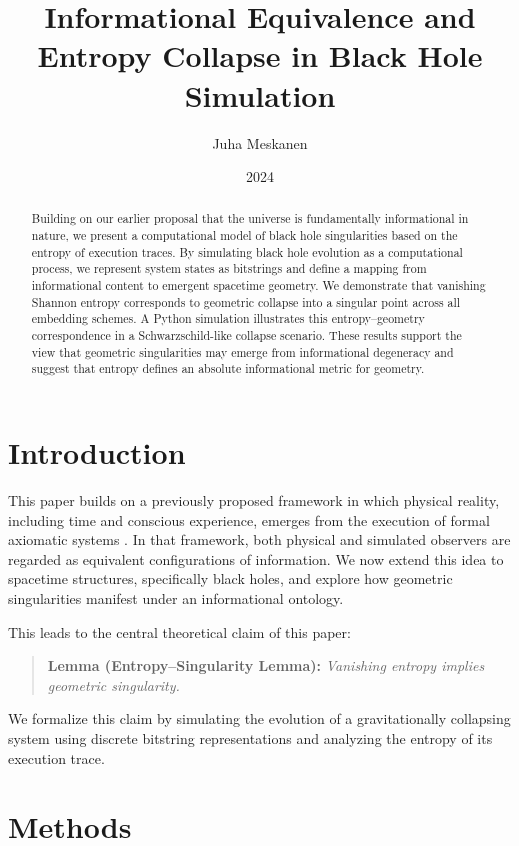 \documentclass[11pt]{article}
\title{Informational Equivalence and Entropy Collapse in Black Hole Simulation}
\author{Juha Meskanen}
\date{2024}
\begin{document}
\maketitle

\begin{abstract}
  Building on our earlier proposal that the universe is fundamentally informational in nature, we present a computational model of black hole singularities based on the entropy of execution traces. By simulating black hole evolution as a computational process, we represent system states as bitstrings and define a mapping from informational content to emergent spacetime geometry. We demonstrate that vanishing Shannon entropy corresponds to geometric collapse into a singular point across all embedding schemes. A Python simulation illustrates this entropy--geometry correspondence in a Schwarzschild-like collapse scenario. These results support the view that geometric singularities may emerge from informational degeneracy and suggest that entropy defines an absolute informational metric for geometry.
\end{abstract}

\section{Introduction}

This paper builds on a previously proposed framework in which physical reality, including time and conscious experience, emerges from the execution of formal axiomatic systems \cite{meskanen2019}. In that framework, both physical and simulated observers are regarded as equivalent configurations of information. We now extend this idea to spacetime structures, specifically black holes, and explore how geometric singularities manifest under an informational ontology.

This leads to the central theoretical claim of this paper:

\begin{quote}
  \textbf{Lemma (Entropy--Singularity Lemma):} \emph{Vanishing entropy implies geometric singularity.}
\end{quote}

We formalize this claim by simulating the evolution of a gravitationally collapsing system using discrete bitstring representations and analyzing the entropy of its execution trace.

\section{Methods}
\end{document}

